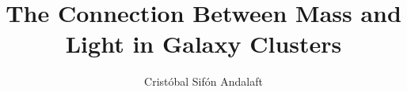 \documentclass[11pt,twoside,openright,b5paper]{book}
\begin{document}
\setcounter{page}{1}

\title{The Connection Between Mass and Light in Galaxy Clusters}
\author{Crist\'obal Sif\'on Andalaft}




\tableofcontents

% 



\renewcommand\thesection{\thechapter.\arabic{section}}


\renewcommand\thesection{\thechapter.\arabic{section}}


\renewcommand\thesection{\thechapter.\arabic{section}}


\renewcommand\thesection{\thechapter.\arabic{section}}


% 

% 




% 



\end{document}
